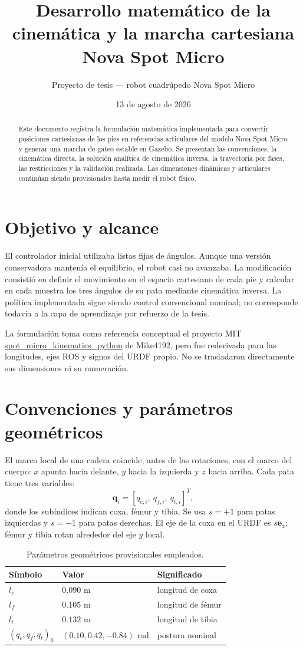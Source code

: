 \documentclass[11pt,a4paper]{article}
\title{Desarrollo matemático de la cinemática y la marcha cartesiana\\
Nova Spot Micro}
\author{Proyecto de tesis --- robot cuadrúpedo Nova Spot Micro}
\date{13 de agosto de 2026}
\newcommand{\vect}[1]{\boldsymbol{#1}}
\begin{document}
\maketitle
\begin{abstract}
Este documento registra la formulación matemática implementada para convertir
posiciones cartesianas de los pies en referencias articulares del modelo
Nova Spot Micro y generar una marcha de gateo estable en Gazebo. Se presentan
las convenciones, la cinemática directa, la solución analítica de cinemática
inversa, la trayectoria por fases, las restricciones y la validación realizada.
Las dimensiones dinámicas y articulares continúan siendo provisionales hasta
medir el robot físico.
\end{abstract}
\tableofcontents

\section{Objetivo y alcance}
El controlador inicial utilizaba listas fijas de ángulos. Aunque una versión
conservadora mantenía el equilibrio, el robot casi no avanzaba. La modificación
consistió en definir el movimiento en el espacio cartesiano de cada pie y
calcular en cada muestra los tres ángulos de su pata mediante cinemática
inversa. La política implementada sigue siendo control convencional nominal;
no corresponde todavía a la capa de aprendizaje por refuerzo de la tesis.

La formulación toma como referencia conceptual el proyecto MIT
\href{https://github.com/mike4192/spot_micro_kinematics_python}{spot\_micro\_kinematics\_python}
de Mike4192, pero fue rederivada para las longitudes, ejes ROS y signos del URDF
propio. No se trasladaron directamente sus dimensiones ni su numeración.

\section{Convenciones y parámetros geométricos}
El marco local de una cadera coincide, antes de las rotaciones, con el marco del
cuerpo: $x$ apunta hacia delante, $y$ hacia la izquierda y $z$ hacia arriba.
Cada pata tiene tres variables:
\[
  \vect q_i = [q_{c,i},\ q_{f,i},\ q_{t,i}]^T,
\]
donde los subíndices indican coxa, fémur y tibia. Se usa
$s=+1$ para patas izquierdas y $s=-1$ para patas derechas. El eje de la coxa
en el URDF es $s\vect e_x$; fémur y tibia rotan alrededor del eje $y$ local.

\begin{table}[h]
\centering
\caption{Parámetros geométricos provisionales empleados.}
\begin{tabular}{lll}
\toprule
Símbolo & Valor & Significado\\
\midrule
$l_c$ & $0.090$ m & longitud de coxa\\
$l_f$ & $0.105$ m & longitud de fémur\\
$l_t$ & $0.132$ m & longitud de tibia\\
$(q_c,q_f,q_t)_0$ & $(0.10,0.42,-0.84)$ rad & postura nominal\\
\bottomrule
\end{tabular}
\end{table}
\end{document}
